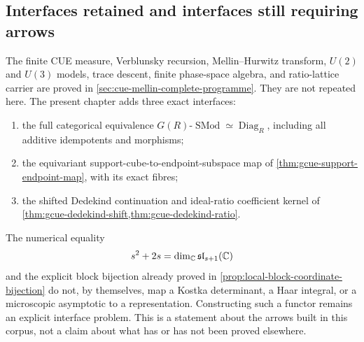 \subsection{Interfaces retained and interfaces still requiring arrows}

The finite CUE measure, Verblunsky recursion, Mellin--Hurwitz transform, $U(2)$ and $U(3)$
models, trace descent, finite phase-space algebra, and ratio-lattice carrier are proved in
\cref{sec:cue-mellin-complete-programme}.  They are not repeated here.  The present chapter adds
three exact interfaces:
\begin{enumerate}
 \item the full categorical equivalence
 $G(R)$-$\operatorname{SMod}\simeq\operatorname{Diag}_R$, including all additive
 idempotents and morphisms;
 \item the equivariant support-cube-to-endpoint-subspace map of
 \cref{thm:gcue-support-endpoint-map}, with its exact fibres;
 \item the shifted Dedekind continuation and ideal-ratio coefficient kernel of
 \cref{thm:gcue-dedekind-shift,thm:gcue-dedekind-ratio}.
\end{enumerate}
The numerical equality
\[
 s^2+2s=\dim_{\mathbb C}\mathfrak{sl}_{s+1}(\mathbb C)
\]
and the explicit block bijection already proved in
\cref{prop:local-block-coordinate-bijection} do not, by themselves, map a Kostka determinant,
a Haar integral, or a microscopic asymptotic to a representation.  Constructing such a
functor remains an explicit interface problem.  This is a statement about the arrows built in
this corpus, not a claim about what has or has not been proved elsewhere.
